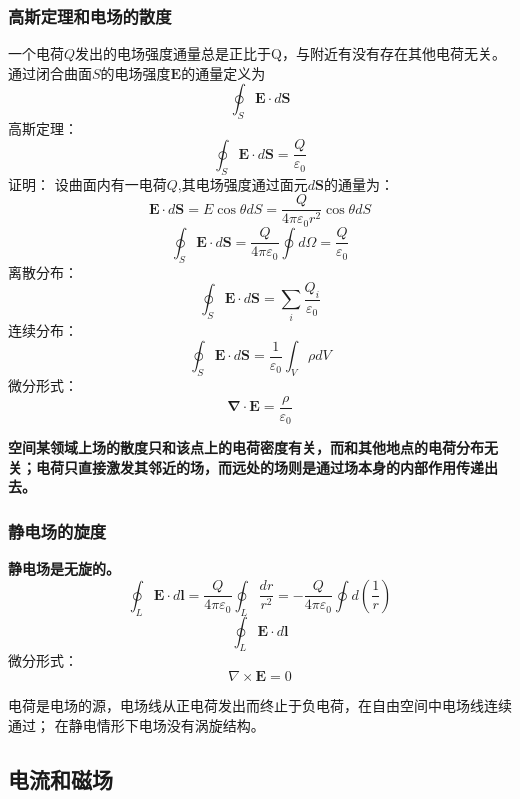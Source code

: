 \documentclass[12pt,a4paper]{ctexart}
\numberwithin{equation}{subsection}
\begin{document}
\subsubsection{高斯定理和电场的散度}
一个电荷$Q$发出的电场强度通量总是正比于Q，与附近有没有存在其他电荷无关。
通过闭合曲面$S$的电场强度$\mathbf{E}$的通量定义为
$$
\oint_S\mathbf{E} \cdot d\mathbf{S}
$$
高斯定理：
$$
\oint_S\mathbf{E} \cdot d\mathbf{S}=\frac{Q}{\varepsilon_0}
$$
证明：
设曲面内有一电荷$Q$,其电场强度通过面元$d\mathbf{S}$的通量为：
$$
\mathbf{E}\cdot d\mathbf{S}=E\cos\theta dS = \frac{Q}{4\pi\varepsilon_0r^2}\cos\theta dS
$$
$$
\oint_S\mathbf{E} \cdot d\mathbf{S}=\frac{Q}{4\pi\varepsilon_0}\oint d\Omega=\frac{Q}{\varepsilon_0}
$$
离散分布：
\begin{equation}
\oint_S\mathbf{E} \cdot d\mathbf{S}=\sum_i\frac{Q_i}{\varepsilon_0}
\end{equation}
连续分布：
\begin{equation}
\oint_S\mathbf{E} \cdot d\mathbf{S}=\frac{1}{\varepsilon_0}\int_V\rho dV
\end{equation}
微分形式：
\begin{equation}
\mathbf{\nabla} \cdot \mathbf{E}=\frac{\rho}{\varepsilon_0}
\end{equation}

\textbf{空间某领域上场的散度只和该点上的电荷密度有关，而和其他地点的电荷分布无关；电荷只直接激发其邻近的场，而远处的场则是通过场本身的内部作用传递出去。}
\subsubsection{静电场的旋度}
\textbf{静电场是无旋的。}
$$
\oint_L\mathbf{E}\cdot d\mathbf{l}=\frac{Q}{4\pi\varepsilon_0}\oint_L\frac{dr}{r^2}=-\frac{Q}{4\pi\varepsilon_0}\oint d(\frac{1}{r})
$$
\begin{equation}
\oint_L\mathbf{E}\cdot d\mathbf{l}
\end{equation}
微分形式：
\begin{equation}
\nabla\times\mathbf{E}=0
\end{equation}

电荷是电场的源，电场线从正电荷发出而终止于负电荷，在自由空间中电场线连续通过；
在静电情形下电场没有涡旋结构。

\subsection{电流和磁场}
\end{document}

